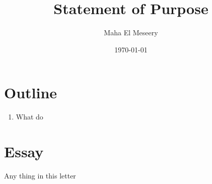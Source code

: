 \documentclass[a4paper,12pt]{article}%
\begin{document}
\title{Statement of Purpose}
\author{Maha El Meseery}
 
\date{\today}
 
\maketitle 

%

\section{Outline}
\begin{enumerate}
	\item What do 
\end{enumerate}

\section{Essay}
Any thing in this letter 
\end{document}
